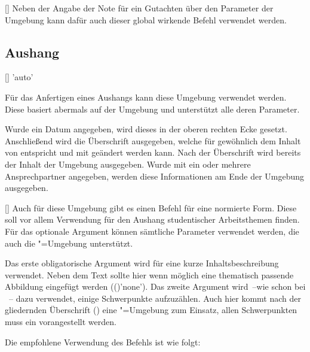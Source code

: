 \begin{Bundle*}{}
\begin{Declaration}{[]}
\printdeclarationlist%
%
Neben der Angabe der Note für ein Gutachten über den Parameter 
 der Umgebung  
kann dafür auch dieser global wirkende Befehl verwendet werden.
\end{Declaration}


\subsection{Aushang}
%
%
\begin{Declaration}{[]}{%
  'auto'%
}
\begin{Declaration}{}
\printdeclarationlist%
%
Für das Anfertigen eines Aushangs kann diese Umgebung verwendet werden. Diese 
basiert abermals auf der Umgebung  und unterstützt alle 
deren Parameter.

Wurde ein Datum angegeben, wird dieses in der oberen rechten Ecke gesetzt. 
Anschließend wird die Überschrift ausgegeben, welche für gewöhnlich dem Inhalt 
von  entspricht und mit  
geändert werden kann. Nach der Überschrift wird bereits der Inhalt der Umgebung 
ausgegeben. Wurde mit  ein oder mehrere Ansprechpartner 
angegeben, werden diese Informationen am Ende der Umgebung ausgegeben.
\end{Declaration}
\end{Declaration}

\begin{Declaration}{%
  [\LParameter{}]%
}
\printdeclarationlist%
%
Auch für diese Umgebung gibt es einen Befehl für eine normierte Form. Diese 
soll vor allem Verwendung für den Aushang studentischer Arbeitsthemen finden. 
Für das optionale Argument können sämtliche Parameter verwendet werden, die 
auch die "=Umgebung unterstützt.

Das erste obligatorische Argument wird für eine kurze Inhaltsbeschreibung 
verwendet. Neben dem Text sollte hier wenn möglich eine thematisch passende 
Abbildung eingefügt werden (()'none'). 
Das zweite Argument wird~--wie schon bei ~-- dazu verwendet, 
einige Schwerpunkte aufzuzählen. Auch hier kommt nach der gliedernden 
Überschrift () eine "=Umgebung zum 
Einsatz, allen Schwerpunkten muss ein  vorangestellt werden.
\end{Declaration}
%
\begin{Example}
Die empfohlene Verwendung des Befehls  ist wie folgt:
\begin{Code}[escapechar=§]
\end{Code}
\end{Example}
\end{Bundle*}
